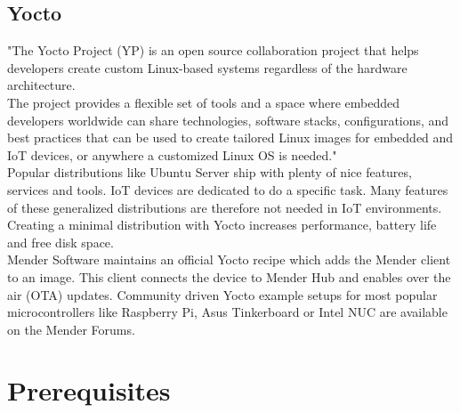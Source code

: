 \subsection{Yocto}
"The Yocto Project (YP) is an open source collaboration project that helps developers create custom Linux-based systems regardless of the hardware architecture.\\
The project provides a flexible set of tools and a space where embedded developers worldwide can share technologies, software stacks, configurations, and best practices that can be used to create tailored Linux images for embedded and IoT devices, or anywhere a customized Linux OS is needed."\cite{yoctoproject}\\
Popular distributions like Ubuntu Server ship with plenty of nice features, services and tools. IoT devices are dedicated to do a specific task. Many features of these generalized distributions are therefore not needed in IoT environments. Creating a minimal distribution with Yocto increases performance, battery life and free disk space.\\
Mender Software maintains an official Yocto recipe which adds the Mender client to an image. This client connects the device to Mender Hub and enables over the air (OTA) updates. Community driven Yocto example setups for most popular microcontrollers like Raspberry Pi, Asus Tinkerboard or Intel NUC are available on the Mender Forums.

\section{Prerequisites}

